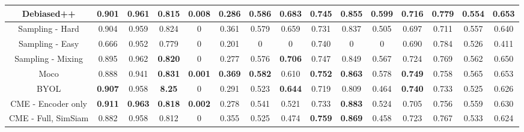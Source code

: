 \documentclass[12pt]{article}
\begin{document}
\begin{center}
\begin{table}[h!]
{\begin{tabular}{ c | c c c c c c c c c c c c c | c }
                Debiased++ \cite{robinson_contrastive_2021}     & 0.901          & 0.961          & 0.815          & \textbf{0.008} & 0.286          & 0.586          & 0.683          & 0.745          & 0.855          & 0.599          & 0.716          & 0.779          & 0.554          & 0.653          \\
                \hline
                Sampling - Hard                                 & 0.904          & 0.959          & 0.824          & 0              & 0.361          & 0.579          & 0.659          & 0.731          & 0.837          & 0.505          & 0.697          & 0.711          & 0.557          & 0.640          \\
                Sampling - Easy                                 & 0.666          & 0.952          & 0.779          & 0              & 0.201          & 0              & 0              & 0.740          & 0              & 0              & 0.690          & 0.784          & 0.526          & 0.411          \\
                Sampling - Mixing \cite{kalantidis_hard_nodate} & 0.895          & 0.962          & \textbf{0.820} & 0              & 0.277          & 0.576          & \textbf{0.706} & 0.747          & 0.849          & 0.567          & 0.724          & 0.769          & 0.562          & 0.650          \\
                \hline
                Moco \cite{he_momentum_2020}                    & 0.888          & 0.941          & \textbf{0.831} & \textbf{0.001} & \textbf{0.369} & \textbf{0.582} & 0.610          & \textbf{0.752} & \textbf{0.863} & 0.578          & \textbf{0.749} & 0.758          & 0.565          & 0.653          \\
                BYOL \cite{grill_bootstrap_nodate}              & \textbf{0.907} & 0.958          & \textbf{8.25}  & 0              & 0.291          & 0.523          & \textbf{0.644} & 0.719          & 0.809          & 0.464          & \textbf{0.740} & 0.733          & 0.525          & 0.626          \\
                \hline
                CME - Encoder only                              & \textbf{0.911} & \textbf{0.963} & \textbf{0.818} & \textbf{0.002} & 0.278          & 0.541          & 0.521          & 0.733          & \textbf{0.883} & 0.524          & 0.705          & 0.756          & 0.559          & 0.630          \\
                CME - Full, SimSiam                             & 0.882          & 0.958          & 0.812          & 0              & 0.355          & 0.525          & 0.474          & \textbf{0.759} & \textbf{0.869} & 0.458          & 0.723          & 0.767          & 0.533          & 0.624          \\

\end{tabular}}
\end{table}
\end{center}
\end{document}
